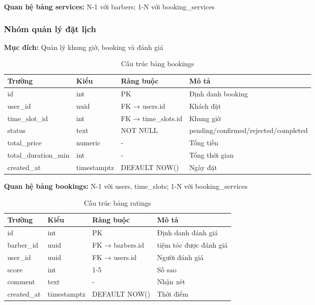 \noindent\textbf{Quan hệ bảng services:} N-1 với barbers; 1-N với booking\_services

\vspace{0.5cm}

\subsubsection{Nhóm quản lý đặt lịch}

\textbf{Mục đích:} Quản lý khung giờ, booking và đánh giá

\begin{table}[H]
\centering
\caption{Cấu trúc bảng bookings}
\begin{tabular}{|l|l|l|p{4.5cm}|}
\hline
\textbf{Trường} & \textbf{Kiểu} & \textbf{Ràng buộc} & \textbf{Mô tả} \\
\hline
id & int & PK & Định danh booking \\
\hline
user\_id & uuid & FK → users.id & Khách đặt \\
\hline
time\_slot\_id & int & FK → time\_slots.id & Khung giờ \\
\hline
status & text & NOT NULL & pending/confirmed/rejected/completed \\
\hline
total\_price & numeric & - & Tổng tiền \\
\hline
total\_duration\_min & int & - & Tổng thời gian \\
\hline
created\_at & timestamptz & DEFAULT NOW() & Ngày đặt \\
\hline
\end{tabular}
\end{table}

\noindent\textbf{Quan hệ bảng bookings:} N-1 với users, time\_slots; 1-N với booking\_services

\vspace{0.3cm}

\begin{table}[H]
\centering
\caption{Cấu trúc bảng ratings}
\begin{tabular}{|l|l|l|p{5cm}|}
\hline
\textbf{Trường} & \textbf{Kiểu} & \textbf{Ràng buộc} & \textbf{Mô tả} \\
\hline
id & int & PK & Định danh đánh giá \\
\hline
barber\_id & uuid & FK → barbers.id & tiệm tóc được đánh giá \\
\hline
user\_id & uuid & FK → users.id & Người đánh giá \\
\hline
score & int & 1-5 & Số sao \\
\hline
comment & text & - & Nhận xét \\
\hline
created\_at & timestamptz & DEFAULT NOW() & Thời điểm \\
\hline
\end{tabular}
\end{table}

